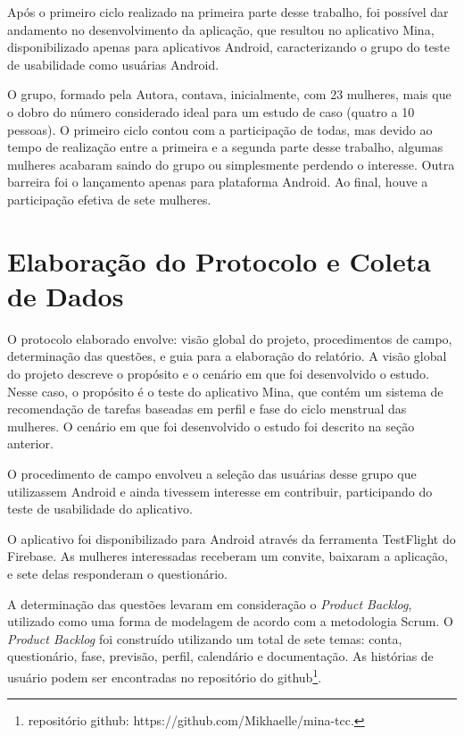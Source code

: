 Após o primeiro ciclo realizado na primeira parte desse trabalho, foi possível dar andamento no desenvolvimento da aplicação, 
que resultou no aplicativo Mina, disponibilizado apenas para aplicativos Android, caracterizando o grupo do teste de usabilidade como 
usuárias Android.

O grupo, formado pela Autora, contava, inicialmente, com 23 mulheres, mais que o dobro do número considerado ideal 
para um estudo de caso (quatro a 10 pessoas). 
O primeiro ciclo contou com a participação de todas, mas devido ao tempo de realização entre a primeira e a segunda parte desse trabalho, 
algumas mulheres acabaram saindo do grupo ou simplesmente perdendo o interesse. Outra barreira foi o lançamento apenas para plataforma Android. 
Ao final, houve a participação efetiva de sete mulheres.


\section{Elaboração do Protocolo e Coleta de Dados}


O protocolo elaborado envolve: visão global do projeto, procedimentos de campo, determinação das questões, e guia para a elaboração do relatório.
A visão global do projeto descreve o propósito e o cenário em que foi desenvolvido o estudo. Nesse caso, o propósito é o teste do aplicativo Mina, que contém 
um sistema de recomendação de tarefas baseadas 
em perfil e fase do ciclo menstrual das mulheres. O cenário em que foi desenvolvido o estudo foi descrito na seção anterior.

O procedimento de campo envolveu a seleção das usuárias desse grupo que utilizassem Android e ainda tivessem interesse em contribuir, participando 
do teste de usabilidade do aplicativo.

O aplicativo foi disponibilizado para Android através da ferramenta TestFlight do Firebase. As mulheres interessadas receberam um convite, 
baixaram a aplicação, e sete 
delas responderam o questionário. 

A determinação das questões levaram em consideração o \emph{Product Backlog}, utilizado como uma 
forma de modelagem de acordo com a metodologia Scrum. 
O \emph{Product Backlog} foi construído utilizando um total de 
sete temas: conta, questionário, fase, previsão, perfil, 
calendário e documentação. As histórias de usuário podem ser 
encontradas no repositório do github\footnote{repositório github: https://github.com/Mikhaelle/mina-tcc.}.


